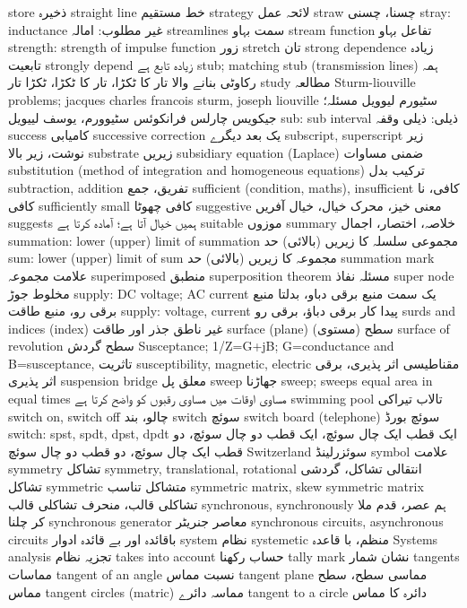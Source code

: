 store	ذخیرہ
straight line	خط مستقیم
strategy	لائحہ عمل
straw	چسنا، چسنی
stray: inductance	غیر مطلوب: امالہ
streamlines	سمت بہاو
stream function	تفاعل بہاو
strength: strength of impulse function	زور
stretch	تان
strong dependence	زیادہ تابعیت
strongly depend	زیادہ تابع ہے
stub; matching stub (transmission lines)	ہمہ رکاوٹی بنانے والا تار کا ٹکڑا، تار کا ٹکڑا، ٹکڑا تار
study	مطالعہ
Sturm-liouville problems; jacques charles francois sturm, joseph liouville	سٹیورم لیوویل مسئلہ؛ جیکویس چارلس فرانکوئس سٹیوورم، یوسف لییویل
sub: sub interval	ذیلی: ذیلی وقفہ
success	کامیابی
successive correction	یک بعد دیگرے
subscript, superscript	زیر نوشت، زیر بالا
substrate	زیریں
subsidiary equation (Laplace)	ضمنی مساوات
substitution (method of integration and homogeneous equations)	ترکیب بدل
subtraction, addition	تفریق، جمع
sufficient (condition, maths), insufficient	کافی، نا کافی
sufficiently small	کافی چھوٹا
suggestive	معنی خیز، محرک خیال، خیال آفریں
suggests	ہمیں خیال آتا ہے؛ آمادہ کرتا ہے
suitable	موزوں
summary	خلاصہ، اختصار، اجمال
summation: lower (upper) limit of summation	مجموعی سلسلہ کا زیریں (بالائی) حد
sum: lower (upper) limit of sum	مجموعہ کا زیریں (بالائی) حد
summation mark	علامت مجموعہ
superimposed	منطبق
superposition theorem	مسئلہ نفاذ
super node	مخلوط جوڑ
supply: DC voltage; AC current	یک سمت منبع برقی دباو، بدلتا منبع برقی رو، منبع طاقت
supply: voltage, current	پیدا کار برقی دباؤ، برقی رو
surds and indices (index)	غیر ناطق جذر اور طاقت
surface (plane)	سطح (مستوی)
surface of revolution	سطح گردش
Susceptance; 1/Z=G+jB;  G=conductance and B=susceptance, 	تاثریت
susceptibility, magnetic, electric	مقناطیسی اثر پذیری، برقی اثر پذیری
suspension bridge	معلق پل
sweep	جھاڑنا
sweep; sweeps equal area in equal times	مساوی اوقات میں مساوی رقبوں کو واضح کرتا ہے
swimming pool	تالاب تیراکی
switch on, switch off	چالو، بند
switch	سوئچ
switch board (telephone)	سوئچ بورڈ
switch: spst, spdt, dpst, dpdt	ایک قطب ایک چال سوئچ، ایک قطب دو چال سوئچ، دو قطب ایک چال سوئچ، دو قطب دو چال سوئچ
Switzerland	سوئزرلینڈ
symbol	علامت
symmetry	تشاکل
symmetry, translational, rotational	انتقالی تشاکل، گردشی تشاکل
symmetric	متشاکل تناسب
symmetric matrix, skew symmetric matrix	تشاکلی قالب، منحرف تشاکلی قالب
synchronous, synchronously	ہم عصر، قدم ملا کر چلنا
synchronous generator	معاصر جنریٹر
synchronous circuits, asynchronous circuits	باقائدہ اور بے قائدہ ادوار
system	نظام
systemetic	منظم، با قاعدہ
Systems analysis	تجزیہ نظام
takes into account	حساب رکھنا
tally mark	نشان شمار
tangents	مماسات
tangent of an angle	نسبت مماس
tangent plane	مماسی سطح، سطح مماس
tangent circles (matric)	مماسہ دائرے
tangent to a circle	دائرہ کا مماس
